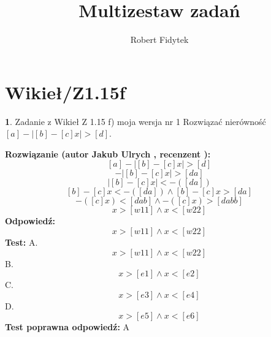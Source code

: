 \documentclass[12pt, a4paper]{article}
\title{Multizestaw zadań}
\author{Robert Fidytek}
\date{}
\theoremstyle{definition} %
\newtheorem{zad}{}
\newcommand{\kategoria}[1]{\section{#1}} %
\newcommand{\zadStart}[1]{\begin{zad}#1\newline} %
\newcommand{\zadStop}{\end{zad}}   %
\newcommand{\rozwStart}[2]{\noindent \textbf{Rozwiązanie (autor #1 , recenzent #2): }\newline} %
\newcommand{\rozwStop}{\newline}                                            %
\newcommand{\odpStart}{\noindent \textbf{Odpowiedź:}\newline}    %
\newcommand{\odpStop}{\newline}                                             %
\newcommand{\testStart}{\noindent \textbf{Test:}\newline} %
\newcommand{\testStop}{\newline} %
\newcommand{\kluczStart}{\noindent \textbf{Test poprawna odpowiedź:}\newline} %
\newcommand{\kluczStop}{\newline} %
\begin{document}
\maketitle


\kategoria{Wikieł/Z1.15f}
\zadStart{Zadanie z Wikieł Z 1.15 f) moja wersja nr 1}
Rozwiązać nierówność $[a]-|[b]-[c]x|>[d]$.
\zadStop
\rozwStart{Jakub Ulrych}{}
$$[a]-|[b]-[c]x|>[d]$$ 
$$-|[b]-[c]x|>[da]$$
$$|[b]-[c]x|<-([da])$$
$$[b]-[c]x< -([da]) \land [b]-[c]x>[da]$$
$$-([c]x)< [dab] \land -([c]x)> [dabb]$$
$$x> [w11] \land x< [w22]$$
\rozwStop
\odpStart
$$x> [w11] \land x< [w22]$$
\odpStop
\testStart
A.$$x > [w11]\land x< [w22]$$
B.$$x >  [e1]\land x < [e2]$$
C.$$x > [e3]\land x < [e4]$$
D.$$x > [e5]\land x <  [e6]$$
\testStop
\kluczStart
A
\kluczStop
\end{document}
